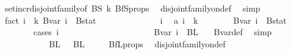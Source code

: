 \begin{isabellebody}
\ set{\isacharunderscore}{\kern0pt}incr{\isacharunderscore}{\kern0pt}disjoint{\isacharunderscore}{\kern0pt}family{\isacharbrackleft}{\kern0pt}of\ BS\ k{\isacharbrackright}{\kern0pt}\ BfS{\isacharunderscore}{\kern0pt}props\ \isamarkupfalse%
\ disjoint{\isacharunderscore}{\kern0pt}family{\isacharunderscore}{\kern0pt}on{\isacharunderscore}{\kern0pt}def\ \isamarkupfalse%
\ simp\ \isanewline
\ \ \ \ \isamarkupfalse%
\ fact{}{\isacharcolon}{\kern0pt}\ {\isachardoublequoteopen}{\isasymforall}i\ {\isasymin}\ {\isacharbraceleft}{\kern0pt}{\isachardot}{\kern0pt}{\isachardot}{\kern0pt}{\isacharless}{\kern0pt}k{\isacharplus}{\kern0pt}{}{\isacharbraceright}{\kern0pt}{\isachardot}{\kern0pt}\ Bvar\ i\ {\isasyminter}\ Bstat\ {\isacharequal}{\kern0pt}\ {\isacharbraceleft}{\kern0pt}{\isacharbraceright}{\kern0pt}{\isachardoublequoteclose}\isanewline
\ \ \ \ \isamarkupfalse%
\isanewline
\ \ \ \ \ \ \isamarkupfalse%
\ i\ \isamarkupfalse%
\ a{\isacharcolon}{\kern0pt}\ {\isachardoublequoteopen}i\ {\isasymin}\ {\isacharbraceleft}{\kern0pt}{\isachardot}{\kern0pt}{\isachardot}{\kern0pt}{\isacharless}{\kern0pt}k{\isacharplus}{\kern0pt}{}{\isacharbraceright}{\kern0pt}{\isachardoublequoteclose}\isanewline
\ \ \ \ \ \ \isamarkupfalse%
\ {\isachardoublequoteopen}Bvar\ i\ {\isasyminter}\ Bstat\ {\isacharequal}{\kern0pt}\ {\isacharbraceleft}{\kern0pt}{\isacharbraceright}{\kern0pt}{\isachardoublequoteclose}\isanewline
\ \ \ \ \ \ \isamarkupfalse%
\ {\isacharparenleft}{\kern0pt}cases\ i{\isacharparenright}{\kern0pt}\isanewline
\ \ \ \ \ \ \ \ \isamarkupfalse%
\ {}\isanewline
\ \ \ \ \ \ \ \ \isamarkupfalse%
\ \isamarkupfalse%
\ {\isachardoublequoteopen}Bvar\ i\ {\isacharequal}{\kern0pt}\ BL\ {}{\isachardoublequoteclose}\ \isamarkupfalse%
\ Bvar{\isacharunderscore}{\kern0pt}def\ \isamarkupfalse%
\ simp\isanewline
\ \ \ \ \ \ \ \ \isamarkupfalse%
\ \isamarkupfalse%
\ {\isachardoublequoteopen}BL\ {}\ {\isasyminter}\ BL\ {}\ {\isacharequal}{\kern0pt}\ {\isacharbraceleft}{\kern0pt}{\isacharbraceright}{\kern0pt}{\isachardoublequoteclose}\ \isamarkupfalse%
\ BfL{\isacharunderscore}{\kern0pt}props\ \isamarkupfalse%
\ disjoint{\isacharunderscore}{\kern0pt}family{\isacharunderscore}{\kern0pt}on{\isacharunderscore}{\kern0pt}def\ \isamarkupfalse%

\end{isabellebody}
